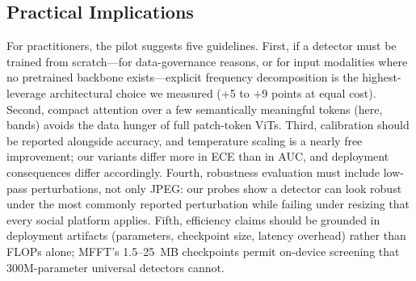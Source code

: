 \documentclass[journal]{IEEEtran}
\begin{document}
\subsection{Practical Implications}
For practitioners, the pilot suggests five guidelines. First, if a detector must be trained from scratch---for data-governance reasons, or for input modalities where no pretrained backbone exists---explicit frequency decomposition is the highest-leverage architectural choice we measured (+5 to +9 points at equal cost). Second, compact attention over a few semantically meaningful tokens (here, bands) avoids the data hunger of full patch-token ViTs. Third, calibration should be reported alongside accuracy, and temperature scaling is a nearly free improvement; our variants differ more in ECE than in AUC, and deployment consequences differ accordingly. Fourth, robustness evaluation must include low-pass perturbations, not only JPEG: our probes show a detector can look robust under the most commonly reported perturbation while failing under resizing that every social platform applies. Fifth, efficiency claims should be grounded in deployment artifacts (parameters, checkpoint size, latency overhead) rather than FLOPs alone; MFFT's 1.5--25~MB checkpoints permit on-device screening that 300M-parameter universal detectors cannot.

\end{document}
